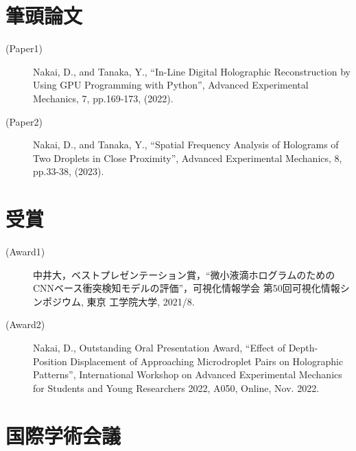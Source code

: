 \section*{筆頭論文}

\begin{description}
    \item[(Paper1)] Nakai, D., and Tanaka, Y., “In-Line Digital Holographic Reconstruction by Using GPU Programming with Python”, Advanced Experimental Mechanics, 7, pp.169-173, (2022).
    \item[(Paper2)] Nakai, D., and Tanaka, Y., “Spatial Frequency Analysis of Holograms of Two Droplets in Close Proximity”, Advanced Experimental Mechanics, 8, pp.33-38, (2023).
\end{description}
\section*{受賞}
\begin{description}
    \item[(Award1)] 中井大，ベストプレゼンテーション賞，“微小液滴ホログラムのためのCNNベース衝突検知モデルの評価”，可視化情報学会 第50回可視化情報シンポジウム, 東京 工学院大学, 2021/8.
    \item[(Award2)] Nakai, D., Outstanding Oral Presentation Award, “Effect of Depth-Position Displacement of Approaching Microdroplet Pairs on Holographic Patterns”, International Workshop on Advanced Experimental Mechanics for Students and Young Researchers 2022, A050, Online, Nov. 2022.
\end{description}
\section*{国際学術会議}


